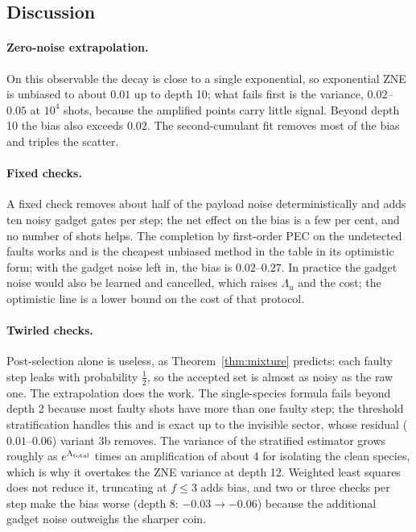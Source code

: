 \documentclass[11pt,a4paper]{article}
\theoremstyle{remark}
\begin{document}
\subsection{Discussion}

\paragraph{Zero-noise extrapolation.} On this observable the decay is close to a single exponential, so exponential ZNE is unbiased to about $0.01$ up to depth 10; what fails first is the variance, $0.02$--$0.05$ at $10^4$ shots, because the amplified points carry little signal. Beyond depth 10 the bias also exceeds $0.02$. The second-cumulant fit removes most of the bias and triples the scatter.

\paragraph{Fixed checks.} A fixed check removes about half of the payload noise deterministically and adds ten noisy gadget gates per step; the net effect on the bias is a few per cent, and no number of shots helps. The completion by first-order PEC on the undetected faults works and is the cheapest unbiased method in the table in its optimistic form; with the gadget noise left in, the bias is $0.02$--$0.27$. In practice the gadget noise would also be learned and cancelled, which raises $\Lambda_u$ and the cost; the optimistic line is a lower bound on the cost of that protocol.

\paragraph{Twirled checks.} Post-selection alone is useless, as Theorem~\ref{thm:mixture} predicts: each faulty step leaks with probability $\tfrac12$, so the accepted set is almost as noisy as the raw one. The extrapolation does the work. The single-species formula fails beyond depth 2 because most faulty shots have more than one faulty step; the threshold stratification handles this and is exact up to the invisible sector, whose residual ($0.01$--$0.06$) variant 3b removes. The variance of the stratified estimator grows roughly as $e^{\Lambda_{\rm total}}$ times an amplification of about 4 for isolating the clean species, which is why it overtakes the ZNE variance at depth 12. Weighted least squares does not reduce it, truncating at $f\le3$ adds bias, and two or three checks per step make the bias worse (depth 8: $-0.03\to-0.06$) because the additional gadget noise outweighs the sharper coin.
\end{document}
